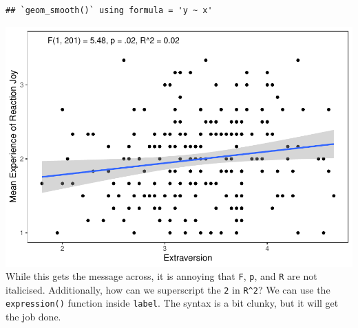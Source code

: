 \documentclass[
]{book}
\begin{document}
\begin{verbatim}
## `geom_smooth()` using formula = 'y ~ x'
\end{verbatim}

\includegraphics{rintro_demo_files/figure-latex/unnamed-chunk-313-1.pdf}
While this gets the message across, it is annoying that \texttt{F}, \texttt{p}, and \texttt{R} are not italicised. Additionally, how can we superscript the \texttt{2} in \texttt{R\^{}2}? We can use the \texttt{expression()} function inside \texttt{label}. The syntax is a bit clunky, but it will get the job done.
\end{document}
